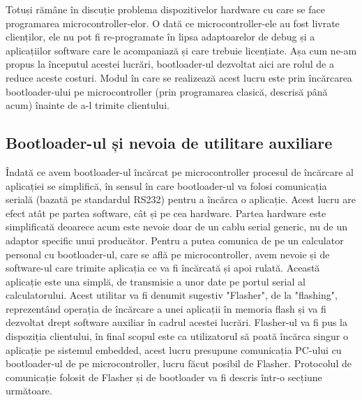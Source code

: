 \documentclass[12pt,a4paper,titlepage]{report}
\begin{document}
Totuși rămâne în discuție problema dispozitivelor hardware cu care se face programarea microcontroller-elor. O dată ce microcontroller-ele au fost livrate clienților, ele nu pot fi re-programate în lipsa adaptoarelor de debug și a aplicațiilor software care le acompaniază și care trebuie licențiate. Așa cum ne-am propus la începutul acestei lucrări, bootloader-ul dezvoltat aici are rolul de a reduce aceste costuri. Modul în care se realizează acest lucru este prin încărcarea bootloader-ului pe microcontroller (prin programarea clasică, descrisă până acum) înainte de a-l trimite clientului.

\subsection{Bootloader-ul și nevoia de utilitare auxiliare}
Îndată ce avem bootloader-ul încărcat pe microcontroller procesul de încărcare al aplicației se simplifică, în sensul în care bootloader-ul va folosi comunicația serială (bazată pe standardul RS232) pentru a încărca o aplicație.
Acest lucru are efect atât pe partea software, cât și pe cea hardware. Partea hardware este simplificată deoarece acum este nevoie doar de un cablu serial generic, nu de un adaptor specific unui producător. Pentru a putea comunica de pe un calculator personal cu bootloader-ul, care se află pe microcontroller, avem nevoie și de software-ul care trimite aplicația ce va fi încărcată și apoi rulată. Această aplicație este una simplă, de transmisie a unor date pe portul serial al calculatorului. Acest utilitar va fi denumit sugestiv "Flasher", de la "flashing", reprezentând operația de încărcare a unei aplicații în memoria flash și va fi dezvoltat drept software auxiliar în cadrul acestei lucrări. Flasher-ul va fi pus la dispoziția clientului, în final scopul este ca utilizatorul să poată încărca singur o aplicație pe sistemul embedded, acest lucru presupune comunicația PC-ului cu bootloader-ul de pe microcontroller, lucru făcut posibil de Flasher. Protocolul de comunicație folosit de Flasher și de bootloader va fi descris într-o secțiune următoare.
\end{document}
